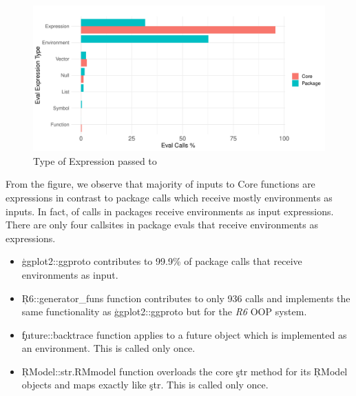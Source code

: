 \documentclass[conference]{IEEEtran}
\begin{document}
\begin{figure}[!h]
	\centering
  \includegraphics[width=\columnwidth]{eval-expression-kind}
  \caption{Type of Expression passed to \eval} \label{fig:eval-expression-kind}
\end{figure}

From the figure, we observe that majority of inputs to Core \eval functions are
expressions in contrast to package \eval calls which receive mostly environments
as inputs. In fact, \PackageEnvironmentInputEvalCallPerc of \eval calls in
packages receive environments as input expressions. There are only four
callsites in package evals that receive environments as expressions.
\begin{itemize}
\item \c{ggplot2::ggproto} contributes to 99.9\% of package \eval calls that
receive environments as input.
\item \c{R6::generator_funs} function contributes to only 936 \eval calls and
implements the same functionality as \c{ggplot2::ggproto} but for the \emph{R6}
OOP system.
\item \c{future::backtrace} function applies \eval to a future object which is
implemented as an environment. This is called only once.
\item \c{RModel::str.RMmodel} function overloads the core \c{str} method for its
\c{RModel} objects and maps \eval exactly like \c{str}. This is called only
once.
\end{itemize}
\end{document}
